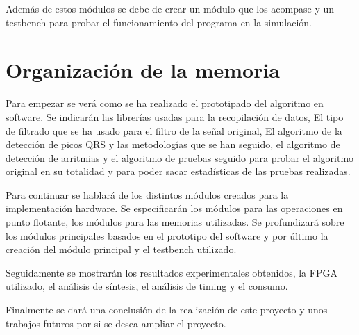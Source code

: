 	Además de estos módulos se debe de crear un módulo que los acompase y un testbench para probar el funcionamiento del programa en la simulación.

\section{Organización de la memoria}
Para empezar se verá como se ha realizado el prototipado del algoritmo en software. Se indicarán las librerías usadas para la recopilación de datos,
El tipo de filtrado que se ha usado para el filtro de la señal original, El algoritmo de la detección de picos QRS y las metodologías que se han seguido,
el algoritmo de detección de arritmias y el algoritmo de pruebas seguido para probar el algoritmo original en su totalidad y para poder sacar estadísticas 
de las pruebas realizadas.

Para continuar se hablará de los distintos módulos creados para la implementación hardware. Se especificarán los módulos para las operaciones en punto
flotante, los módulos para las memorias utilizadas. Se profundizará sobre los módulos principales basados en el prototipo del software y por último la creación 
del módulo principal y el testbench utilizado.

Seguidamente se mostrarán los resultados experimentales obtenidos, la FPGA utilizado, el análisis de síntesis, el análisis de timing y el consumo.

Finalmente se dará una conclusión de la realización de este proyecto y unos trabajos futuros por si se desea ampliar el proyecto.
